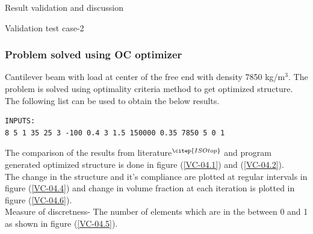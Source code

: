 \documentclass[a4paper,12pt,times]{article}
\begin{document}
\begin{section}{Result validation and discussion}
\begin{subsection}{Validation test case-2}
\begin{figure}[H]
\label{VC-03.4}
\end{figure}

\subsubsection{Problem solved using OC optimizer}
Cantilever beam with load at center of the free end with density 7850 kg/m$^3$. The problem is solved using optimality criteria method to get optimized structure. The following list can be used to obtain the below results.\\
\begin{lstlisting}
INPUTS:
8 5 1 35 25 3 -100 0.4 3 1.5 150000 0.35 7850 5 0 1
\end{lstlisting}
The comparison of the results from literature$^{\citep{ISOtop}}$ and program generated optimized structure is done in figure (\ref{VC-04.1}) and (\ref{VC-04.2}).\\
The change in the structure and it's compliance are plotted at regular intervals in figure (\ref{VC-04.4}) and change in volume fraction at each iteration is plotted in figure (\ref{VC-04.6}).\\
Measure of discretness- The number of elements which are in the between 0 and 1 as shown in figure (\ref{VC-04.5}).\\
 

\end{subsection}
\end{section}
\end{document}

